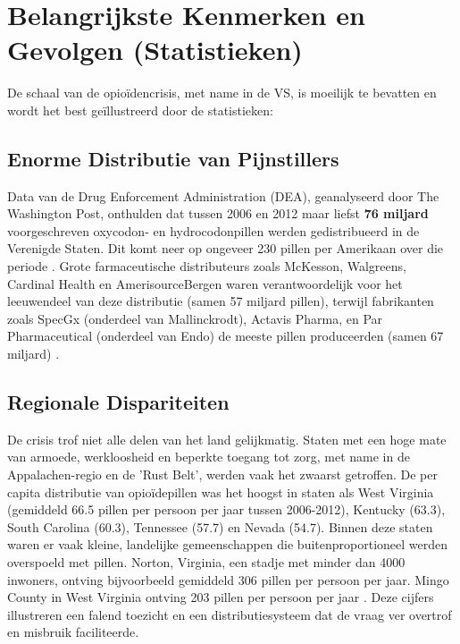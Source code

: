 \documentclass[11pt, a4paper]{report} %
\begin{document}
\section{Belangrijkste Kenmerken en Gevolgen (Statistieken)}
De schaal van de opioïdencrisis, met name in de VS, is moeilijk te bevatten en wordt het best geïllustreerd door de statistieken:
\subsection{Enorme Distributie van Pijnstillers}
Data van de Drug Enforcement Administration (DEA), geanalyseerd door The Washington Post, onthulden dat tussen 2006 en 2012 maar liefst \textbf{76 miljard} voorgeschreven oxycodon- en hydrocodonpillen werden gedistribueerd in de Verenigde Staten. Dit komt neer op ongeveer 230 pillen per Amerikaan over die periode \parencite{WikipediaOpioidEpidemicUS}. Grote farmaceutische distributeurs zoals McKesson, Walgreens, Cardinal Health en AmerisourceBergen waren verantwoordelijk voor het leeuwendeel van deze distributie (samen 57 miljard pillen), terwijl fabrikanten zoals SpecGx (onderdeel van Mallinckrodt), Actavis Pharma, en Par Pharmaceutical (onderdeel van Endo) de meeste pillen produceerden (samen 67 miljard) \parencite{WikipediaOpioidEpidemicUS}.

\subsection{Regionale Dispariteiten}
De crisis trof niet alle delen van het land gelijkmatig. Staten met een hoge mate van armoede, werkloosheid en beperkte toegang tot zorg, met name in de Appalachen-regio en de 'Rust Belt', werden vaak het zwaarst getroffen. De per capita distributie van opioïdepillen was het hoogst in staten als West Virginia (gemiddeld 66.5 pillen per persoon per jaar tussen 2006-2012), Kentucky (63.3), South Carolina (60.3), Tennessee (57.7) en Nevada (54.7). Binnen deze staten waren er vaak kleine, landelijke gemeenschappen die buitenproportioneel werden overspoeld met pillen. Norton, Virginia, een stadje met minder dan 4000 inwoners, ontving bijvoorbeeld gemiddeld 306 pillen per persoon per jaar. Mingo County in West Virginia ontving 203 pillen per persoon per jaar \parencite{WikipediaOpioidEpidemicUS}. Deze cijfers illustreren een falend toezicht en een distributiesysteem dat de vraag ver overtrof en misbruik faciliteerde.
\end{document}
